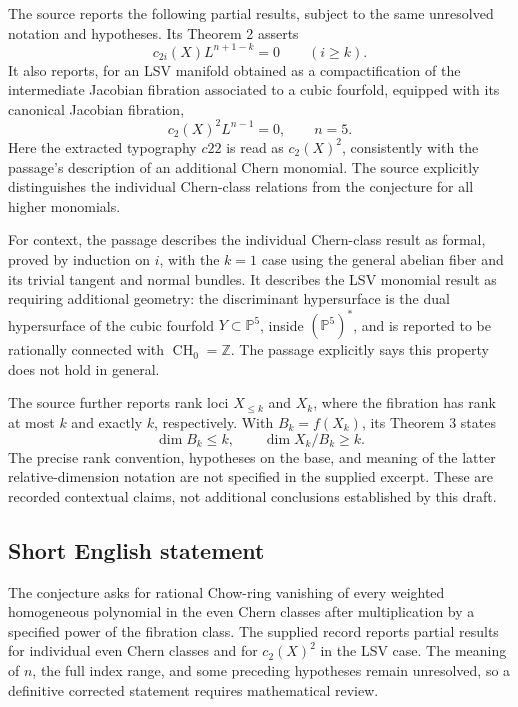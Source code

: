 \documentclass[11pt]{article}
\newcommand{\Z}{\mathbb{Z}}
\newcommand{\PP}{\mathbb{P}}
\begin{document}
The source reports the following partial results, subject to the same unresolved notation and hypotheses. Its Theorem 2 asserts
\[
 c_{2i}(X)L^{n+1-k}=0\qquad(i\geq k).
\]
It also reports, for an LSV manifold obtained as a compactification of the intermediate Jacobian fibration associated to a cubic fourfold, equipped with its canonical Jacobian fibration,
\[
 c_2(X)^2L^{n-1}=0,\qquad n=5.
\]
Here the extracted typography \(c22\) is read as \(c_2(X)^2\), consistently with the passage's description of an additional Chern monomial. The source explicitly distinguishes the individual Chern-class relations from the conjecture for all higher monomials.

For context, the passage describes the individual Chern-class result as formal, proved by induction on \(i\), with the \(k=1\) case using the general abelian fiber and its trivial tangent and normal bundles. It describes the LSV monomial result as requiring additional geometry: the discriminant hypersurface is the dual hypersurface of the cubic fourfold \(Y\subset\PP^5\), inside \((\PP^5)^*\), and is reported to be rationally connected with \(\operatorname{CH}_0=\Z\). The passage explicitly says this property does not hold in general.

The source further reports rank loci \(X_{\leq k}\) and \(X_k\), where the fibration has rank at most \(k\) and exactly \(k\), respectively. With \(B_k=f(X_k)\), its Theorem 3 states
\[
 \dim B_k\leq k,\qquad \dim X_k/B_k\geq k.
\]
The precise rank convention, hypotheses on the base, and meaning of the latter relative-dimension notation are not specified in the supplied excerpt. These are recorded contextual claims, not additional conclusions established by this draft.
\subsection{Short English statement}
The conjecture asks for rational Chow-ring vanishing of every weighted homogeneous polynomial in the even Chern classes after multiplication by a specified power of the fibration class. The supplied record reports partial results for individual even Chern classes and for \(c_2(X)^2\) in the LSV case. The meaning of \(n\), the full index range, and some preceding hypotheses remain unresolved, so a definitive corrected statement requires mathematical review.
\end{document}
